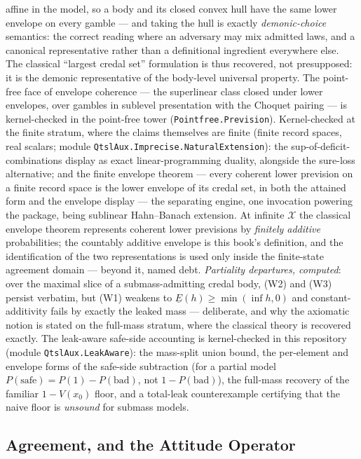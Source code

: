 \begin{remark}
affine in the model, so a body and its closed convex hull have the
same lower envelope on every gamble --- and taking the hull is
exactly \emph{demonic-choice} semantics: the correct reading where
an adversary may mix admitted laws, and a canonical representative
rather than a definitional ingredient everywhere else. The classical
``largest credal set'' formulation is thus recovered, not
presupposed: it is the demonic representative of the body-level
universal property. The point-free face of envelope coherence
--- the superlinear class closed under lower envelopes, over
gambles in sublevel presentation with the Choquet pairing --- is
kernel-checked in the point-free tower
(\texttt{Pointfree.Prevision}). Kernel-checked at the finite
stratum, where the claims themselves are finite (finite record
spaces, real scalars; module
\texttt{QtslAux.Imprecise.NaturalExtension}): the
sup-of-deficit-combinations display as exact
linear-programming duality, alongside the sure-loss alternative;
and the finite
envelope theorem --- every coherent lower prevision on a finite
record space is the lower envelope of its credal set, in both the
attained form and the envelope display --- the separating engine,
one invocation powering the package, being sublinear Hahn--Banach
extension. At infinite $\mathcal{X}$ the classical envelope theorem
represents coherent lower previsions by \emph{finitely additive}
probabilities; the countably additive envelope is this book's
definition, and the identification of the two representations is
used only inside the finite-state agreement domain --- beyond it,
named debt. \emph{Partiality departures, computed}: over the
maximal slice of a submass-admitting credal body, (W2) and
(W3) persist verbatim, but (W1) weakens to
$\underline{E}(h) \ge \min(\inf h, 0)$ and constant-additivity fails
by exactly the leaked mass --- deliberate, and why the axiomatic
notion is stated on the full-mass stratum, where the classical
theory is recovered exactly. The leak-aware safe-side accounting is
kernel-checked in this repository (module \texttt{QtslAux.LeakAware}): the mass-split union bound,
the per-element and envelope forms of the safe-side subtraction (for
a partial model
$P(\mathrm{safe}) = P(1) - P(\mathrm{bad})$, not
$1 - P(\mathrm{bad})$), the full-mass recovery of the familiar
$1 - V(x_0)$ floor, and a total-leak counterexample certifying that
the naive floor is \emph{unsound} for submass models.
\end{remark}

\subsection{Agreement, and the Attitude Operator}

